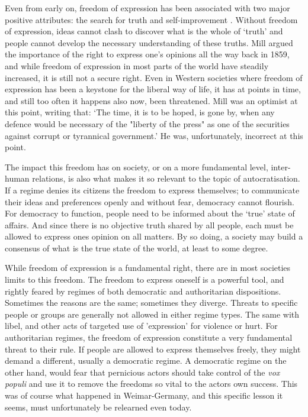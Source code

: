 Even from early on, freedom of expression has been associated with two major positive attributes: the search for truth and self-improvement \citep[pp. 25-80]{mill_liberty_2010}. Without freedom of expression, ideas cannot clash to discover what is the whole of `truth' and people cannot develop the necessary understanding of these truths. Mill argued the importance of the right to express one's opinions all the way back in 1859, and while freedom of expression in most parts of the world have steadily increased, it is still not a secure right. Even in Western societies where freedom of expression has been a keystone for the liberal way of life, it has at points in time, and still too often it happens also now, been threatened. Mill was an optimist at this point, writing that: `The time, it is to be hoped, is gone by, when any defence would be necessary of the "liberty of the press" as one of the securities against corrupt or tyrannical government.'  \citep[p. 25]{mill_liberty_2010} He was, unfortunately, incorrect at this point. 

The impact this freedom has on society, or on a more fundamental level, inter-human relations, is also what makes it so relevant to the topic of autocratisation. If a regime denies its citizens the freedom to express themselves; to communicate their ideas and preferences openly and without fear, democracy cannot flourish. For democracy to function, people need to be informed about the `true' state of affairs. And since there is no objective truth shared by all people, each must be allowed to express ones opinion on all matters. By so doing, a society may build a consensus of what is the true state of the world, at least to some degree. 

While freedom of expression is a fundamental right, there are in most societies limits to this freedom. The freedom to express oneself is a powerful tool, and rightly feared by regimes of both democratic and authoritarian dispositions. Sometimes the reasons are the same; sometimes they diverge. Threats to specific people or groups are generally not allowed in either regime types. The same with libel, and other acts of targeted use of 'expression' for violence or hurt. For authoritarian regimes, the freedom of expression constitute a very fundamental threat to their rule. If people are allowed to express themselves freely, they might demand a different, usually a democratic regime. A democratic regime on the other hand, would fear that pernicious actors should take control of the \textit{vox populi} and use it to remove the freedoms so vital to the actors own success. This was of course what happened in Weimar-Germany, and this specific lesson it seems, must unfortunately be relearned even today. 


